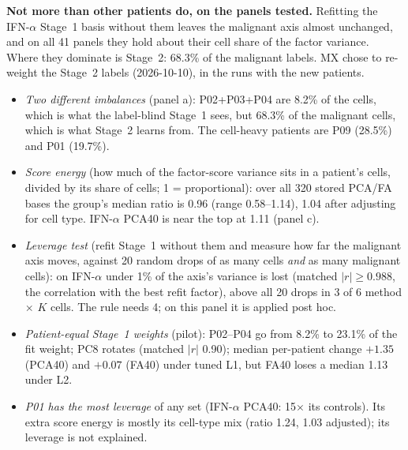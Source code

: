 
\begin{coreanswer}
\textbf{Not more than other patients do, on the panels tested.} Refitting the IFN-$\alpha$ Stage~1 basis without them leaves the malignant axis almost unchanged, and on all 41 panels they hold about their cell share of the factor variance. Where they dominate is Stage~2: 68.3\% of the malignant labels. MX chose to re-weight the Stage~2 labels (2026-10-10), in the runs with the new patients.
\end{coreanswer}

\evidence
\begin{itemize}[leftmargin=1.3em]
\item \emph{Two different imbalances} (panel a): P02+P03+P04 are 8.2\% of the cells, which is what the label-blind Stage~1 sees, but 68.3\% of the malignant cells, which is what Stage~2 learns from. The cell-heavy patients are P09 (28.5\%) and P01 (19.7\%).
\item \emph{Score energy} (how much of the factor-score variance sits in a patient's cells, divided by its share of cells; 1 = proportional): over all 320 stored PCA/FA bases the group's median ratio is 0.96 (range 0.58--1.14), 1.04 after adjusting for cell type. IFN-$\alpha$ PCA40 is near the top at 1.11 (panel c).
\item \emph{Leverage test} (refit Stage~1 without them and measure how far the malignant axis moves, against 20 random drops of as many cells \emph{and} as many malignant cells): on IFN-$\alpha$ under 1\% of the axis's variance is lost (matched $|r| \geq 0.988$, the correlation with the best refit factor), above all 20 drops in 3 of 6 method $\times$ $K$ cells. The rule needs 4; on this panel it is applied post hoc.
\item \emph{Patient-equal Stage~1 weights} (pilot): P02--P04 go from 8.2\% to 23.1\% of the fit weight; PC8 rotates (matched $|r|$ 0.90); median per-patient change $+1.35$ (PCA40) and $+0.07$\pp{} (FA40) under tuned L1, but FA40 loses a median 1.13\pp{} under L2.
\item \emph{P01 has the most leverage} of any set (IFN-$\alpha$ PCA40: 15$\times$ its controls). Its extra score energy is mostly its cell-type mix (ratio 1.24, 1.03 adjusted); its leverage is not explained.
\end{itemize}

